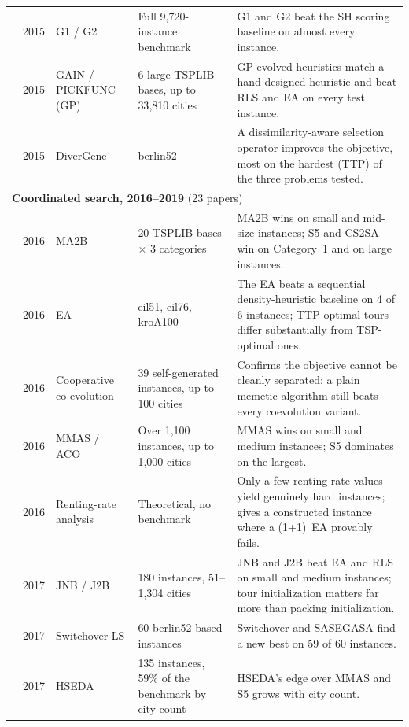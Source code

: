 {\begin{longtable}{@{}p{2.8cm}cp{3.0cm}p{4.9cm}p{7.9cm}@{}}
\citet{gupta2015greedy} & 2015 & G1 / G2 & Full 9{,}720-instance benchmark & G1 and G2 beat the SH scoring baseline on almost every instance. \\
\citet{mei2015heuristic} & 2015 & GAIN / PICKFUNC (GP) & 6 large TSPLIB bases, up to 33{,}810 cities & GP-evolved heuristics match a hand-designed heuristic and beat RLS and EA on every test instance. \\
\citet{strzezek2015divergene} & 2015 & DiverGene & berlin52 & A dissimilarity-aware selection operator improves the objective, most on the hardest (TTP) of the three problems tested. \\
\midrule \multicolumn{5}{l}{\textbf{Coordinated search, 2016--2019} (23 papers)} \\ \midrule
\citet{el2016population} & 2016 & MA2B & 20 TSPLIB bases $\times$ 3 categories & MA2B wins on small and mid-size instances; S5 and CS2SA win on Category~1 and on large instances. \\
\citet{lourencco2016evolutionary} & 2016 & EA & eil51, eil76, kroA100 & The EA beats a sequential density-heuristic baseline on 4 of 6 instances; TTP-optimal tours differ substantially from TSP-optimal ones. \\
\citet{mei2016investigation} & 2016 & Cooperative co-evolution & 39 self-generated instances, up to 100 cities & Confirms the objective cannot be cleanly separated; a plain memetic algorithm still beats every coevolution variant. \\
\citet{wagner2016stealing} & 2016 & MMAS / ACO & Over 1{,}100 instances, up to 1{,}000 cities & MMAS wins on small and medium instances; S5 dominates on the largest. \\
\citet{wu2016impact} & 2016 & Renting-rate analysis & Theoretical, no benchmark & Only a few renting-rate values yield genuinely hard instances; gives a constructed instance where a (1+1)~EA provably fails. \\
\citet{el2017local} & 2017 & JNB / J2B & 180 instances, 51--1{,}304 cities & JNB and J2B beat EA and RLS on small and medium instances; tour initialization matters far more than packing initialization. \\
\citet{karder2017solving} & 2017 & Switchover LS & 60 berlin52-based instances & Switchover and SASEGASA find a new best on 59 of 60 instances. \\
\citet{martins2017hseda} & 2017 & HSEDA & 135 instances, 59\% of the benchmark by city count & HSEDA's edge over MMAS and S5 grows with city count. \\

\end{longtable}}
